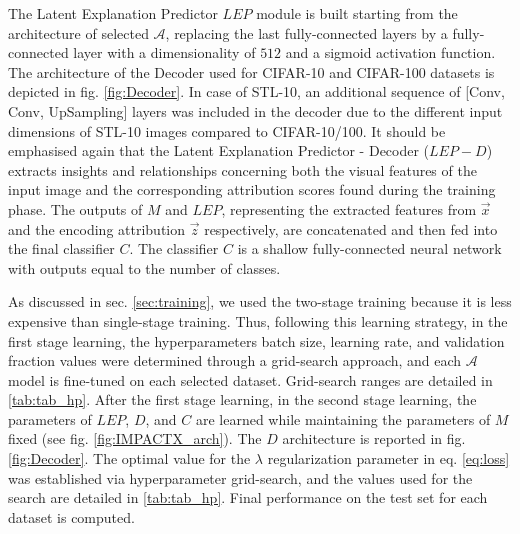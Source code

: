 The Latent Explanation Predictor $LEP$ module is built starting from the architecture of selected $\mathcal{A}$, replacing the last fully-connected layers by a fully-connected layer with a dimensionality of $512$
and a sigmoid activation function. The architecture of the Decoder used for CIFAR-10 and CIFAR-100 datasets is depicted in fig. \ref{fig:Decoder}. In case of STL-10, an additional sequence of [Conv, Conv, UpSampling] layers was included in the decoder due to the different input dimensions of STL-10 images compared to CIFAR-10/100. It should be emphasised again that the Latent Explanation Predictor - Decoder ($LEP-D$) extracts insights and relationships concerning both the visual features of the input image and the corresponding attribution scores found during the training phase. The outputs of $M$ and $LEP$, representing the extracted features from $\vec{x}$ and the encoding attribution $\vec{z}$ respectively, are concatenated and then fed into the final classifier $C$. The classifier $C$ is a shallow fully-connected neural network with outputs equal to the number of classes. 

 

As discussed in sec. \ref{sec:training}, we used the two-stage training because it is less expensive than single-stage training. 
Thus, following this learning strategy, in the first stage learning, the hyperparameters batch size, learning rate, and validation fraction values were determined through a grid-search approach, and each $\mathcal{A}$ model is fine-tuned on each selected dataset. Grid-search ranges are detailed in \cref{tab:tab_hp}. After the first stage learning, 
in the second stage learning, the parameters of $LEP$, $D$, and $C$ are learned while maintaining the parameters of $M$ fixed (see fig. \ref{fig:IMPACTX_arch}).
The $D$ architecture is reported in fig. \ref{fig:Decoder}. The optimal value for the $\lambda$ regularization parameter in eq. \ref{eq:loss} was established via hyperparameter grid-search, and the values used for the search are detailed in \cref{tab:tab_hp}.
Final performance on the test set for each dataset is computed. 

